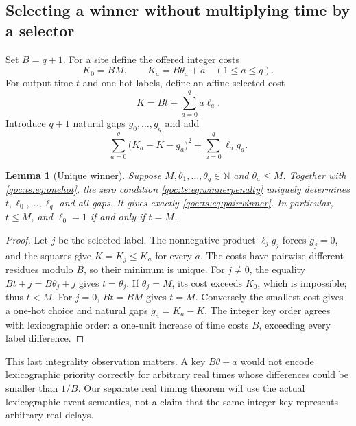 \documentclass[11pt,letterpaper]{article}
\newtheorem{lemma}[theorem]{Lemma}
\theoremstyle{definition}
\theoremstyle{remark}
\newcommand{\N}{\mathbb N}
\begin{document}
\subsection{Selecting a winner without multiplying time by a selector}
Set $B=q+1$. For a site define the offered integer costs
\begin{equation}\label{qoc:ts:eq:costs}
 K_0=BM,\qquad K_a=B\theta_a+a\quad(1\le a\le q).
\end{equation}
For output time $t$ and one-hot labels, define an affine selected cost
\begin{equation}\label{qoc:ts:eq:selectedcost}
 K=Bt+\sum_{a=0}^q a\ell_a.
\end{equation}
Introduce $q+1$ natural gaps $g_0,\ldots,g_q$ and add
\begin{equation}\label{qoc:ts:eq:winnerpenalty}
 \sum_{a=0}^q\bigl(K_a-K-g_a\bigr)^2+
 \sum_{a=0}^q\ell_a g_a.
\end{equation}

\begin{lemma}[Unique winner]\label{qoc:ts:lem:winner}
Suppose $M,\theta_1,\ldots,\theta_q\in\N$ and $\theta_a\le M$.
Together with \eqref{qoc:ts:eq:onehot}, the zero condition
\eqref{qoc:ts:eq:winnerpenalty} uniquely determines $t,\ell_0,\ldots,\ell_q$
and all gaps. It gives exactly \eqref{qoc:ts:eq:pairwinner}. In particular,
$t\le M$, and $\ell_0=1$ if and only if $t=M$.
\end{lemma}
\begin{proof}
Let $j$ be the selected label. The nonnegative product $\ell_jg_j$
forces $g_j=0$, and the squares give $K=K_j\le K_a$ for every $a$.
The costs have pairwise different residues modulo $B$, so their minimum
is unique. For $j\ne0$, the equality $Bt+j=B\theta_j+j$ gives
$t=\theta_j$. If $\theta_j=M$, its cost exceeds $K_0$, which is
impossible; thus $t<M$. For $j=0$, $Bt=BM$ gives $t=M$.
Conversely the smallest cost gives a one-hot choice and natural gaps
$g_a=K_a-K$. The integer key order agrees with lexicographic order:
a one-unit increase of time costs $B$, exceeding every label difference.
\end{proof}

This last integrality observation matters. A key $B\theta+a$ would not
encode lexicographic priority correctly for arbitrary real times whose
differences could be smaller than $1/B$. Our separate real timing theorem
will use the actual lexicographic event semantics, not a claim that the
same integer key represents arbitrary real delays.
\end{document}
